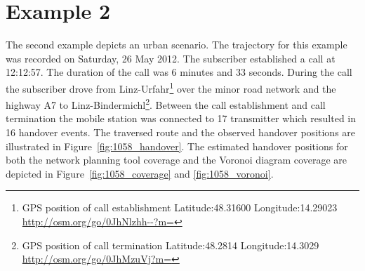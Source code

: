 \section{Example 2}
The second example depicts an urban scenario. The trajectory for this example was recorded on Saturday, 26 May 2012. The subscriber established a call at 12:12:57. The duration of the call was 6 minutes and 33 seconds. During the call the subscriber drove from Linz-Urfahr\footnote{GPS position of call establishment Latitude:48.31600 Longitude:14.29023 \url{http://osm.org/go/0JhNlzhh--?m=}} over the minor road network and the highway A7 to Linz-Bindermichl\footnote{GPS position of call termination Latitude:48.2814 Longitude:14.3029 \url{http://osm.org/go/0JhMzuVj?m=}}. Between the call establishment and call termination the mobile station was connected to 17 transmitter which resulted in 16 handover events. The traversed route and the observed handover positions are illustrated in Figure~\ref{fig:1058_handover}. The estimated handover positions for both the network planning tool coverage and the Voronoi diagram coverage are depicted in Figure~\ref{fig:1058_coverage} and \ref{fig:1058_voronoi}.

